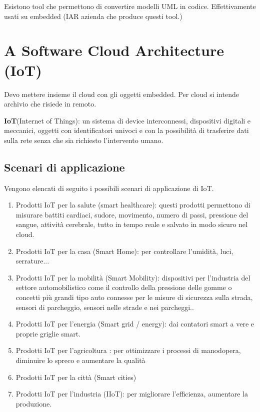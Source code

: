\documentclass[a4paper]{article}
\theoremstyle{definition}
\begin{document}
			Esistono tool che permettono di convertire modelli UML in codice. Effettivamente usati su embedded (IAR azienda che produce questi tool.)	
	
	\section{A Software Cloud Architecture (IoT)}
		Devo mettere insieme il cloud con gli oggetti embedded. Per cloud si intende archivio che risiede in remoto.
		
		\textbf{IoT}(Internet of Things): un sistema di device interconnessi, dispositivi digitali e meccanici, oggetti con identificatori univoci e con la possibilità di trasferire dati sulla rete senza che sia richiesto l'intervento umano. 
		
		
		\subsection{Scenari di applicazione}
			Vengono elencati di seguito i possibili scenari di applicazione di IoT.
			\begin{enumerate}
				\item Prodotti IoT per la salute (smart healthcare): questi prodotti permettono di misurare battiti cardiaci, sudore, movimento, numero di passi, pressione del sangue, attività cerebrale, tutto in tempo reale e salvato in modo sicuro nel cloud.
				\item Prodotti IoT per la casa (Smart Home): per controllare l'umidità, luci, serrature...
				\item Prodotti IoT per la mobilità (Smart Mobility): dispositivi per l'industria del settore automobilistico come il controllo della pressione delle gomme o concetti più grandi tipo auto connesse per le misure di sicurezza sulla strada, sensori di parcheggio, sensori nelle strade e nei parcheggi..
				\item Prodotti IoT per l'energia (Smart grid / energy): dai contatori smart a vere e proprie griglie smart.
				\item Prodotti IoT per l'agricoltura : per ottimizzare i processi di manodopera, diminuire lo spreco e aumentare la qualità
				\item Prodotti IoT per la città (Smart cities)
				\item Prodotti IoT per l'industria (IIoT): per migliorare l'efficienza, aumentare la produzione.
			\end{enumerate}
			
\end{document}
